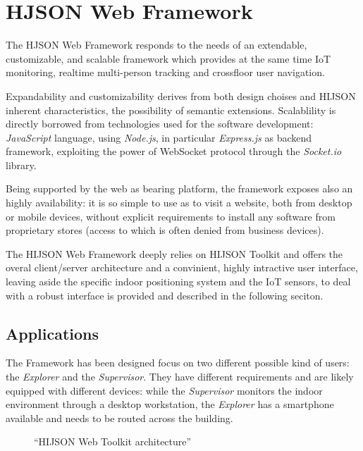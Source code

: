 \section{HJSON Web Framework}\label{hjson-web-framework}

The HJSON Web Framework responds to the needs of an extendable,
customizable, and scalable framework which provides at the same time IoT
monitoring, realtime multi-person tracking and crossfloor user
navigation.

Expandability and customizability derives from both design choises and
HIJSON inherent characteristics, the possibility of semantic extensions.
Scalablility is directly borrowed from technologies used for the
software development: \emph{JavaScript} language, using \emph{Node.js},
in particular \emph{Express.js} as backend framework, exploiting the
power of WebSocket protocol through the \emph{Socket.io} library.

Being supported by the web as bearing platform, the framework exposes
also an highly availability: it is so simple to use as to visit a
website, both from desktop or mobile devices, without explicit
requirements to install any software from proprietary stores (access to
which is often denied from business devices).

The HIJSON Web Framework deeply relies on HIJSON Toolkit and offers the
overal client/server architecture and a convinient, highly intractive
user interface, leaving aside the specific indoor positioning system and
the IoT sensors, to deal with a robust interface is provided and
described in the following seciton.

\subsection{Applications}\label{applications}

The Framework has been designed focus on two different possible kind of
users: the \emph{Explorer} and the \emph{Supervisor}. They have
different requirements and are likely equipped with different devices:
while the \emph{Supervisor} monitors the indoor environment through a
desktop workstation, the \emph{Explorer} has a smartphone available and
needs to be routed across the building.

\begin{figure*}[htb]
\centering
{}
\caption{``HIJSON Web Toolkit architecture''}
\label{fig:pipeline}
\end{figure*}


